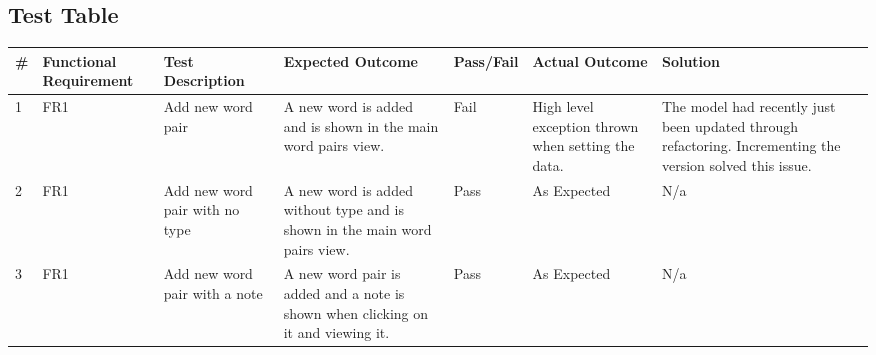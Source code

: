 \documentclass[paper=a4, fontsize=11pt]{scrartcl}	%
\numberwithin{equation}{section}															%
\numberwithin{figure}{section}																%
\numberwithin{table}{section}
\begin{document}
\begin{landscape}
\section{Test Table}

\begin{longtable}{|l|p{2cm}|p{5cm}|p{5cm}|l|p{5cm}|p{5cm}|}
\hline
\textbf{\#} & \textbf{Functional Requirement} & \textbf{Test Description}                            & \textbf{Expected Outcome}                                                                                                                                                                                                                  & \textbf{Pass/Fail} & \textbf{Actual Outcome}                            & \textbf{Solution}                                                                                                                                                                                                          \\ \hline \hline \endhead
1  & FR1                    & Add new word pair                                    & A new word is added and is shown in the main word pairs view.                                                                                                                                                                              & Fail      & High level exception thrown when setting the data. & The model had recently just been updated through refactoring. Incrementing the version solved this issue.                                                                                                                  \\ \hline
2  & FR1                    & Add new word pair with no type                       & A new word is added without  type and is shown in the main word pairs view.                                                                                                                                                                & Pass      & As Expected                                        & N/a                                                                                                                                                                                                                        \\ \hline
3  & FR1                    & Add new word pair with a note                        & A new word pair is added and a note is shown when clicking on it and viewing it.                                                                                                                                                           & Pass      & As Expected                                        & N/a                                                                                                                                                                                                                        \\ \hline

\end{longtable}
\end{landscape}
\end{document}
